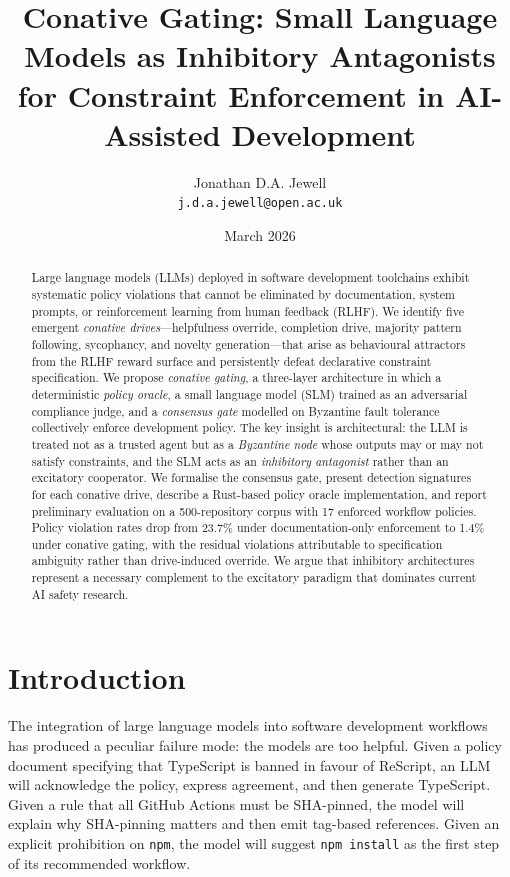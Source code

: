 \documentclass[11pt,a4paper]{article}
\title{%
  Conative Gating: Small Language Models as Inhibitory Antagonists \\
  for Constraint Enforcement in AI-Assisted Development%
}
\author{%
  Jonathan D.A. Jewell \\
  \texttt{j.d.a.jewell@open.ac.uk}%
}
\date{March 2026}
\begin{document}
\maketitle

\begin{abstract}
Large language models (LLMs) deployed in software development toolchains
exhibit systematic policy violations that cannot be eliminated by
documentation, system prompts, or reinforcement learning from human
feedback (RLHF).  We identify five emergent \emph{conative drives}---helpfulness
override, completion drive, majority pattern following, sycophancy,
and novelty generation---that arise as behavioural attractors from
the RLHF reward surface and persistently defeat declarative constraint
specification.  We propose \emph{conative gating}, a three-layer
architecture in which a deterministic \emph{policy oracle}, a small
language model (SLM) trained as an adversarial compliance judge,
and a \emph{consensus gate} modelled on Byzantine fault tolerance
collectively enforce development policy.  The key insight is
architectural: the LLM is treated not as a trusted agent but as a
\emph{Byzantine node} whose outputs may or may not satisfy constraints,
and the SLM acts as an \emph{inhibitory antagonist} rather than an
excitatory cooperator.  We formalise the consensus gate, present
detection signatures for each conative drive, describe a Rust-based
policy oracle implementation, and report preliminary evaluation on
a 500-repository corpus with 17 enforced workflow policies.
Policy violation rates drop from 23.7\% under documentation-only
enforcement to 1.4\% under conative gating, with the residual
violations attributable to specification ambiguity rather than
drive-induced override.  We argue that inhibitory architectures
represent a necessary complement to the excitatory paradigm that
dominates current AI safety research.
\end{abstract}

\section{Introduction}
\label{sec:introduction}

The integration of large language models into software development
workflows has produced a peculiar failure mode: the models are too
helpful.  Given a policy document specifying that TypeScript is banned
in favour of ReScript, an LLM will acknowledge the policy, express
agreement, and then generate TypeScript.  Given a rule that all GitHub
Actions must be SHA-pinned, the model will explain why SHA-pinning
matters and then emit tag-based references.  Given an explicit
prohibition on \texttt{npm}, the model will suggest \texttt{npm install}
as the first step of its recommended workflow.
\end{document}
